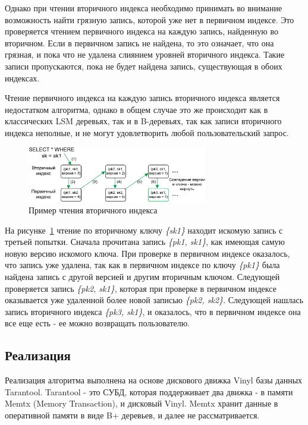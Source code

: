 \documentclass[a4paper,hidelinks,12pt]{article}
\begin{document}
Однако при чтении вторичного индекса необходимо принимать во внимание
возможность найти грязную запись, которой уже нет в первичном индексе. Это
проверяется чтением первичного индекса на каждую запись, найденную во вторичном.
Если в первичном запись не найдена, то это означает, что она грязная, и пока что
не удалена слиянием уровней вторичного индекса. Такие записи пропускаются, пока
не будет найдена запись, существующая в обоих индексах.

Чтение первичного индекса на каждую запись вторичного индекса является
недостатком алгоритма, однако в общем случае это же происходит как в
классических LSM деревьях, так и в B-деревьях, так как записи вторичного индекса
неполные, и не могут удовлетворить любой пользовательский запрос.

\begin{figure}[h]
\centering
\includegraphics[width=0.7\textwidth]{secondary_reading_example}
\caption{Пример чтения вторичного индекса}
\label{fig:secondary_reading_example}
\end{figure}

На рисунке~\ref{fig:secondary_reading_example} чтение по вторичному ключу
\textit{\{sk1\}} находит искомую запись с третьей попытки. Сначала прочитана
запись \textit{\{pk1, sk1\}}, как имеющая самую новую версию искомого ключа.
При проверке в первичном индексе оказалось, что запись уже удалена, так как в
первичном индексе по ключу \textit{\{pk1\}} была найдена запись с другой версией
и другим вторичным ключом. Следующей проверяется запись \textit{\{pk2, sk1\}},
которая при проверке в первичном индексе оказывается уже удаленной более новой
записью \textit{\{pk2, sk2\}}. Следующей нашлась запись вторичного индекса
\textit{\{pk3, sk1\}}, и оказалось, что в первичном индексе она все еще есть -
ее можно возвращать пользователю.

\subsection{Реализация}
Реализация алгоритма выполнена на основе дискового движка Vinyl базы данных
Tarantool. Tarantool - это СУБД, которая поддерживает два движка - в памяти
Memtx (Memory Transaction), и дисковый Vinyl. Memtx хранит данные в оперативной
памяти в виде B+ деревьев, и далее не рассматривается.
\end{document}
